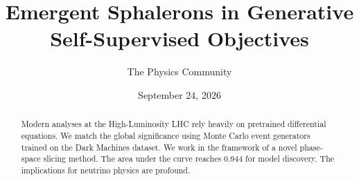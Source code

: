 \documentclass[11pt]{article}
\title{Emergent Sphalerons in Generative Self-Supervised Objectives}
\author{The Physics Community}
\date{September 24, 2026}
\numberwithin{equation}{section}
\theoremstyle{definition}
\theoremstyle{remark}
\begin{document}
\maketitle
\begin{abstract}
Modern analyses at the High-Luminosity LHC rely heavily on pretrained
differential equations. We match the global significance using Monte
Carlo event generators trained on the Dark Machines dataset. We work in
the framework of a novel phase-space slicing method. The area under the
curve reaches 0.944 for model discovery. The implications for neutrino
physics are profound.
\end{abstract}
\tableofcontents




\nocite{*}


\end{document}
